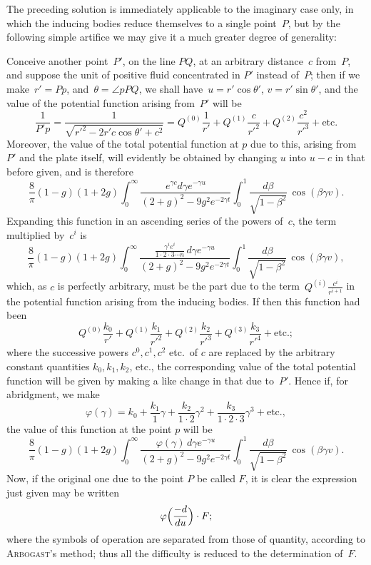 \documentclass[12pt,notitlepage]{amsart}
\let\Person\textsc
\renewcommand{\phi}{\varphi}
\begin{document}
The preceding solution is immediately applicable to the imaginary case
only, in which the inducing bodies reduce themselves to a single point~$P$,
but by the following simple artifice we may give it a much greater degree
of generality:

Conceive another point~$P'$, on the line $PQ$, at an arbitrary distance~$c$
from~$P$, and suppose the unit of positive fluid concentrated in $P'$
instead of~$P$;
then if we make~$r'=Pp$,
and~$\theta=\angle pPQ$,
we shall have~$u=r'\cos\theta'$, $v=r'\sin\theta'$,
and the value of the potential function arising from~$P'$ will be
\[
\frac{1}{P'p}=
\frac{1}{\sqrt{r'^2-2r'c\cos\theta'+c^2}}
=Q^{(0)}\frac{1}{r'}
+Q^{(1)}\frac{c}{r'^2}
+Q^{(2)}\frac{c^2}{r'^3}
+\text{etc.}
\]
Moreover, the value of the total potential function at $p$ due to this, arising
from~$P'$ and the plate itself, will evidently be obtained by changing $u$ into
$u-c$ in that before given, and is therefore
\[
\frac8\pi(1-g)(1+2g)
\int_0^\infty\frac{e^{\gamma c}d\gamma e^{-\gamma u}}
{(2+g)^2-9g^2e^{-2\gamma t}}
\int_0^1\frac{d\beta}{\sqrt{1-\beta^2}}\,\cos(\beta\gamma v).
\]
Expanding this function in an ascending series of the powers of~$c$, the term
multiplied by~$c^i$ is
\[
\frac8\pi(1-g)(1+2g)
\int_0^\infty\frac
{\frac{\gamma^ie^i}{1\cdot2\cdot3\cdots n}\,d\gamma e^{-\gamma u}}
{(2+g)^2-9g^2e^{-2\gamma t}}
\int_0^1\frac{d\beta}{\sqrt{1-\beta^2}}\,\cos(\beta\gamma v),
\]
which, as $c$ is perfectly arbitrary,
must be the part due to the term~$Q^{(i)}\frac{c^i}{r^{i+1}}$
in the potential function arising from the inducing bodies.
If then this function
had been
\[
Q^{(0)}\frac{k_0}{r'}
+Q^{(1)}\frac{k_1}{r'^2}
+Q^{(2)}\frac{k_2}{r'^3}
+Q^{(3)}\frac{k_3}{r'^4}
+\text{etc.};
\]
where the successive powers $c^0,c^1,c^2$ etc.\ of $c$
are replaced by the arbitrary
constant quantities $k_0,k_1,k_2$, etc.,
the corresponding value of the total potential
function will be given by making a like change in that due to~$P'$.
Hence if,
for abridgment, we make
\[
\phi(\gamma)=
k_0+\frac{k_1}{1}\gamma+\frac{k_2}{1\cdot2}\gamma^2
+\frac{k_3}{1\cdot2\cdot3}\gamma^3+
\text{etc.},
\]
the value of this function at the point $p$ will be
\[
\frac8\pi(1-g)(1+2g)
\int_0^\infty\frac{\phi(\gamma)\,d\gamma e^{-\gamma u}}
{(2+g)^2-9g^2e^{-2\gamma t}}
\int_0^1\frac{d\beta}{\sqrt{1-\beta^2}}\,\cos(\beta\gamma v).
\]
Now, if the original one due to the point $P$ be called $F$, it is clear the
expression just given may be written
\[
\phi\Bigl(\frac{-d}{du}\Bigr)\cdot F;
\]
where the symbols of operation are separated from those of quantity, according
to \Person{Arbogast}'s method;
thus all the difficulty is reduced to the determination of~$F$.
\end{document}

